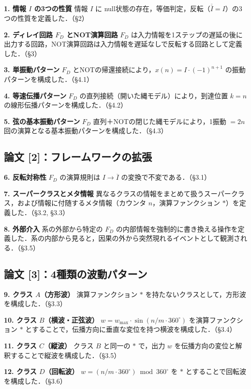 \documentclass[12pt,a4paper]{ltjsarticle}
\begin{document}
\textbf{1. 情報 $I$ の3つの性質}\quad
情報 $I$ に null状態の存在，等価判定，反転（$\overline{\overline{I}} = I$）の3つの性質を定義した．（\S 2）

\textbf{2. ディレイ回路 $F_D$ とNOT演算回路}\quad
$F_D$ は入力情報を1ステップの遅延の後に出力する回路，NOT演算回路は入力情報を遅延なしで反転する回路として定義した．（\S 3）

\textbf{3. 単振動パターン}\quad
$F_D$ とNOTの帰還接続により，$x(n) = I \cdot (-1)^{n+1}$ の振動パターンを構成した．（\S 4.1）

\textbf{4. 等速伝播パターン}\quad
$F_D$ の直列接続（開いた縄モデル）により，到達位置 $k = n$ の線形伝播パターンを構成した．（\S 4.2）

\textbf{5. 弦の基本振動パターン}\quad
$F_D$ 直列＋NOTの閉じた縄モデルにより，1振動 $= 2n$ 回の演算となる基本振動パターンを構成した．（\S 4.3）

\subsection*{論文 [2]：フレームワークの拡張}

\textbf{6. 反転対称性}\quad
$F_D$ の演算規則は $I \to \overline{I}$ の変換で不変である．（\S 3.1）

\textbf{7. スーパークラスとメタ情報}\quad
異なるクラスの情報をまとめて扱うスーパークラス，および情報に付随するメタ情報（カウンタ $n$，演算ファンクション $*$）を定義した．（\S 3.2, \S 3.3）

\textbf{8. 外部介入}\quad
系の外部から特定の $F_D$ の内部情報を強制的に書き換える操作を定義した．系の内部から見ると，因果の外から突然現れるイベントとして観測される．（\S 3.5）

\subsection*{論文 [3]：4種類の波動パターン}

\textbf{9. クラス $A$（方形波）}\quad
演算ファンクション $*$ を持たないクラスとして，方形波を構成した．（\S 3.3）

\textbf{10. クラス $B$（横波・正弦波）}\quad
$w = w_{\max} \cdot \sin(n/m \cdot 360^\circ)$ を演算ファンクション $*$ とすることで，伝播方向に垂直な変位を持つ横波を構成した．（\S 3.4）

\textbf{11. クラス $C$（縦波）}\quad
クラス $B$ と同一の $*$ で，出力 $w$ を伝播方向の変位と解釈することで縦波を構成した．（\S 3.5）

\textbf{12. クラス $D$（回転波）}\quad
$w = (n/m \cdot 360^\circ) \bmod 360^\circ$ を $*$ とすることで回転波を構成した．（\S 3.6）
\end{document}

